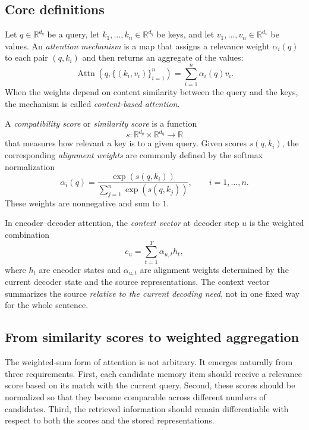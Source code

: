 \subsection*{Core definitions}

\begin{definition}
Let $q\in\mathbb{R}^{d_q}$ be a query, let $k_1,\dots,k_n\in\mathbb{R}^{d_q}$ be keys, and let $v_1,\dots,v_n\in\mathbb{R}^{d_v}$ be values.
An \emph{attention mechanism} is a map that assigns a relevance weight $\alpha_i(q)$ to each pair $(q,k_i)$ and then returns an aggregate of the values:
\[
\operatorname{Attn}(q,\{(k_i,v_i)\}_{i=1}^n)
= \sum_{i=1}^{n} \alpha_i(q) v_i.
\]
When the weights depend on content similarity between the query and the keys, the mechanism is called \emph{content-based attention}.
\end{definition}

\begin{definition}
A \emph{compatibility score} or \emph{similarity score} is a function
\[
 s:\mathbb{R}^{d_q}\times \mathbb{R}^{d_q}\to\mathbb{R}
\]
that measures how relevant a key is to a given query.
Given scores $s(q,k_i)$, the corresponding \emph{alignment weights} are commonly defined by the softmax normalization
\[
 \alpha_i(q)=\frac{\exp(s(q,k_i))}{\sum_{j=1}^{n}\exp(s(q,k_j))},
 \qquad i=1,\dots,n.
\]
These weights are nonnegative and sum to $1$.
\end{definition}

\begin{definition}
In encoder--decoder attention, the \emph{context vector} at decoder step $u$ is the weighted combination
\[
 c_u = \sum_{t=1}^{T} \alpha_{u,t} h_t,
\]
where $h_t$ are encoder states and $\alpha_{u,t}$ are alignment weights determined by the current decoder state and the source representations.
The context vector summarizes the source \emph{relative to the current decoding need}, not in one fixed way for the whole sentence.
\end{definition}

\subsection*{From similarity scores to weighted aggregation}

The weighted-sum form of attention is not arbitrary.
It emerges naturally from three requirements.
First, each candidate memory item should receive a relevance score based on its match with the current query.
Second, these scores should be normalized so that they become comparable across different numbers of candidates.
Third, the retrieved information should remain differentiable with respect to both the scores and the stored representations.

